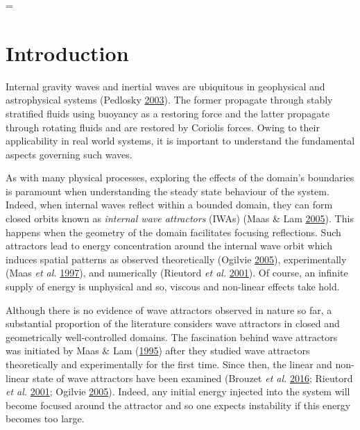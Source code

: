 \documentclass[a4paper]{article}
\numberwithin{equation}{section}
\begin{document}
\parskip = \baselineskip

 \section{Introduction}
Internal gravity waves and inertial waves are ubiquitous in geophysical and astrophysical systems (Pedlosky \hyperlink{ref 1}{2003}). The former propagate through stably stratified fluids using buoyancy as a restoring force and the latter propagate through rotating fluids and are restored by Coriolis forces. Owing to their applicability in real world systems, it is important to understand the fundamental aspects governing such waves. 

As with many physical processes, exploring the effects of the domain's boundaries is paramount when understanding the steady state behaviour of the system. Indeed, when internal waves reflect within a bounded domain, they can form closed orbits known as \emph{internal wave attractors} (IWAs) (Maas \& Lam \hyperlink{ref 10}{2005}). This happens when the geometry of the domain facilitates focusing reflections. Such attractors lead to energy concentration around the internal wave orbit which induces spatial patterns as observed theoretically (Ogilvie \hyperlink{ref 13}{2005}), experimentally (Maas \emph{et al.} \hyperlink{ref 11}{1997}), and numerically (Rieutord \emph{et al.} \hyperlink{ref 12}{2001}). Of course, an infinite supply of energy is unphysical and so, viscous and non-linear effects take hold.

Although there is no evidence of wave attractors observed in nature so far, a substantial proportion of the literature considers wave attractors in closed and geometrically well-controlled domains. The fascination behind wave attractors was initiated by Maas \& Lam (\hyperlink{ref 17}{1995}) after they studied wave attractors theoretically and experimentally for the first time. Since then, the linear and non-linear state of wave attractors have been examined (Brouzet \emph{et al.} \hyperlink{ref 26}{2016}; Rieutord \emph{et al.} \hyperlink{ref 12}{2001}; Ogilvie \hyperlink{ref 13}{2005}). Indeed, any initial energy injected into the system will become focused around the attractor and so one expects instability if this energy becomes too large.
\end{document}
